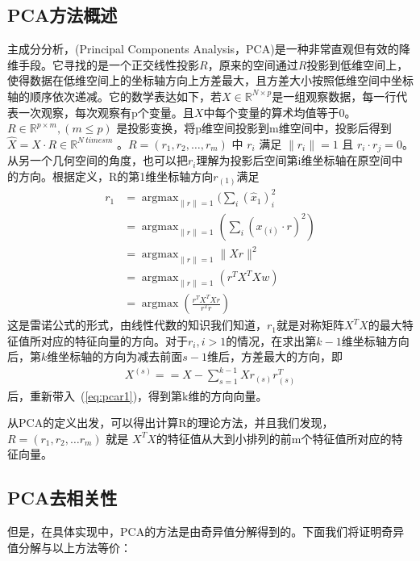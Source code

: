     \subsection{PCA方法概述}
    主成分分析，(Principal Components Analysis，PCA)是一种非常直观但有效的降维手段。它寻找的是一个正交线性投影$R$，原来的空间通过$R$投影到低维空间上，使得数据在低维空间上的坐标轴方向上方差最大，且方差大小按照低维空间中坐标轴的顺序依次递减。它的数学表达如下，若$X \in \mathbb{R}^{N\times p}  $是一组观察数据，每一行代表一次观察，每次观察有p个变量。且$X$中每个变量的算术均值等于0。$R \in \mathbb{R} ^{p \times m}, (m \leqslant p) $ 是投影变换，将p维空间投影到m维空间中，投影后得到$\hat{X} = X\cdot R \in \mathbb{R}^{N \ times m}$ 。$R = (r_1, r_2, \dots, r_m)$ 中 $r_i$ 满足 $ \|r_i\| = 1$ 且 $r_i \cdot r_j = 0$。从另一个几何空间的角度，也可以把$r_i$理解为投影后空间第i维坐标轴在原空间中的方向。根据定义，R的第1维坐标轴方向$r_{(1)}$满足
    \begin{equation}
    \label{eq:pcar1}
    \begin{split}
        r_{1} & = \mathop{\arg\max}_{\|r\|=1} (\sum_i(\hat{x} _1)^2_{i} \\
        & = \mathop{\arg\max}_{\|r\| = 1}(\sum_i(x_{(i)}\cdot r)^2) \\
        & = \mathop{\arg\max} _{\|r\|=1} \|Xr\|^2 \\
        & = \mathop{arg\max}_{\|r\|= 1} (r^TX^TXw) \\
        & = \mathop{\arg\max} (\frac{r^TX^TXr}{r^Tr}) 
    \end{split}
    \end{equation}
    这是雷诺公式\cite{rayleigh}的形式，由线性代数的知识我们知道，$r_1$就是对称矩阵$X^TX$的最大特征值所对应的特征向量的方向。对于$r_i, i > 1$的情况，在求出第$k-1$维坐标轴方向后，第$k$维坐标轴的方向为减去前面$s-1$维后，方差最大的方向，即
    \begin{equation}
    \begin{split}
        X^{(s)} = = X - \sum^{k - 1}_{s = 1} Xr_{(s)}r_{(s)}^T
    \end{split}    
    \end{equation}
    后，重新带入~(\ref{eq:pcar1})，得到第k维的方向向量。

    从PCA的定义出发，可以得出计算R的理论方法，并且我们发现，$R = (r_1, r_2, \dots r_m)$ 就是 $X^T X$的特征值从大到小排列的前m个特征值所对应的特征向量。

    \subsection{PCA去相关性}
    但是，在具体实现中，PCA的方法是由奇异值分解得到的。下面我们将证明奇异值分解与以上方法等价：
    

